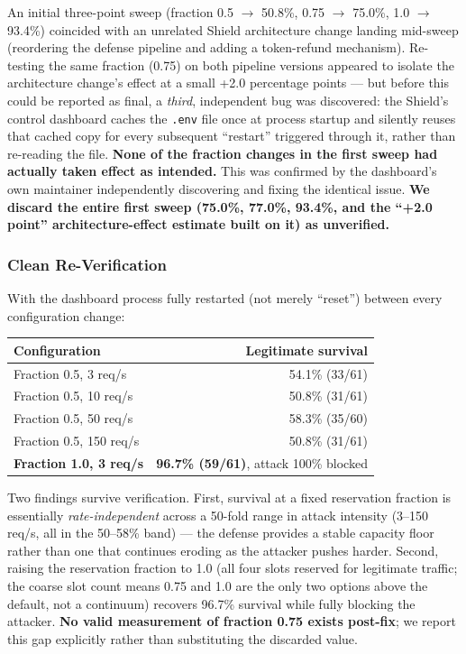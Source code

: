 \documentclass[11pt]{article}
\begin{document}
An initial three-point sweep (fraction 0.5 $\to$ 50.8\%, 0.75 $\to$ 75.0\%,
1.0 $\to$ 93.4\%) coincided with an unrelated Shield architecture change
landing mid-sweep (reordering the defense pipeline and adding a token-refund
mechanism). Re-testing the same fraction (0.75) on both pipeline versions
appeared to isolate the architecture change's effect at a small +2.0
percentage points --- but before this could be reported as final, a
\emph{third}, independent bug was discovered: the Shield's control dashboard
caches the \texttt{.env} file once at process startup and silently reuses
that cached copy for every subsequent ``restart'' triggered through it, rather
than re-reading the file. \textbf{None of the fraction changes in the first
sweep had actually taken effect as intended.} This was confirmed by the
dashboard's own maintainer independently discovering and fixing the identical
issue. \textbf{We discard the entire first sweep (75.0\%, 77.0\%, 93.4\%, and
the ``+2.0 point'' architecture-effect estimate built on it) as unverified.}

\subsubsection{Clean Re-Verification}

With the dashboard process fully restarted (not merely ``reset'') between
every configuration change:

\begin{center}
\begin{tabular}{lr}
\toprule
Configuration & Legitimate survival \\
\midrule
Fraction 0.5, 3 req/s & 54.1\% (33/61) \\
Fraction 0.5, 10 req/s & 50.8\% (31/61) \\
Fraction 0.5, 50 req/s & 58.3\% (35/60) \\
Fraction 0.5, 150 req/s & 50.8\% (31/61) \\
\textbf{Fraction 1.0, 3 req/s} & \textbf{96.7\% (59/61)}, attack 100\% blocked \\
\bottomrule
\end{tabular}
\end{center}

Two findings survive verification. First, survival at a fixed reservation
fraction is essentially \emph{rate-independent} across a 50-fold range in
attack intensity (3--150 req/s, all in the 50--58\% band) --- the defense
provides a stable capacity floor rather than one that continues eroding as
the attacker pushes harder. Second, raising the reservation fraction to 1.0
(all four slots reserved for legitimate traffic; the coarse slot count means
0.75 and 1.0 are the only two options above the default, not a continuum)
recovers 96.7\% survival while fully blocking the attacker. \textbf{No valid
measurement of fraction 0.75 exists post-fix}; we report this gap explicitly
rather than substituting the discarded value.
\end{document}
